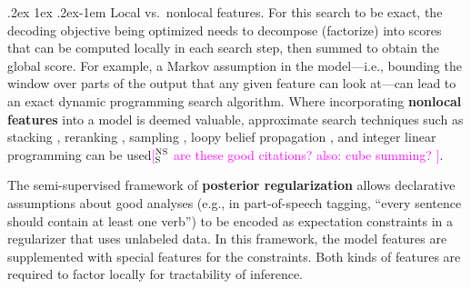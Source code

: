 \documentclass[11pt,letterpaper]{article}
\makeatletter
\newcommand{\ensuretext}[1]{#1}
\newcommand{\nssmarker}{\ensuretext{\textcolor{magenta}{\ensuremath{^{\textsc{NS}}_{\textsc{S}}}}}}
\newcommand{\arkcomment}[3]{\ensuretext{\textcolor{#3}{[#1 #2]}}}
\newcommand{\nss}[1]{\arkcomment{\nssmarker}{#1}{magenta}}
\renewcommand{\paragraph}{%
  \@startsection{paragraph}{4}%
  {\z@}{.2ex \@plus 1ex \@minus .2ex}{-1em}%
  {\normalfont\normalsize\bfseries}%
}
\makeatother
\begin{document}
\paragraph{Local vs.~nonlocal features.} 
For this search to be exact, the decoding objective being optimized 
needs to decompose (factorize) into scores that can be computed locally 
in each search step, then summed to obtain the global score. 
For example, a Markov assumption in the model---i.e., 
bounding the window over parts of the output that any given feature can look at---can 
lead to an exact dynamic programming search algorithm.
Where incorporating \textbf{nonlocal features} into a model is deemed valuable, 
approximate search techniques such as stacking \citep{cohen-05,krishnan-06,martins-08}, 
reranking \citep{collins-05,koo-05,toutanova-05,huang-08}, sampling \citep{finkel-05}, 
loopy belief propagation \citep{sutton-04,smith-08},
and integer linear programming \citep{roth-05,martins-09} can be used\nss{are these good citations? also: cube summing? \citep{gimpel-09}}.

The semi-supervised framework of \textbf{posterior regularization} \citep{ganchev-10} 
allows declarative assumptions about good analyses (e.g., in part-of-speech tagging, ``every sentence should contain at least one verb'') 
to be encoded as expectation constraints in a regularizer that uses unlabeled data.
In this framework, the model features are supplemented with special features for the constraints.
Both kinds of features are required to factor locally for tractability of inference.
\end{document}
